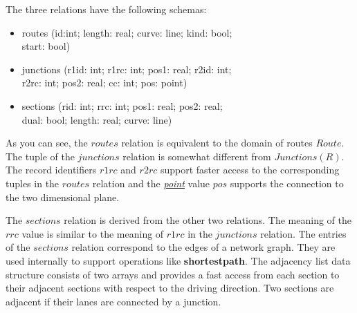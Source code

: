 \documentclass[a4paper]{article}
\newcommand{\op}[1]{\textbf{#1}}
\newcommand{\dt}[1]{\textsl{\underline{#1}}}
\begin{document}
The three relations have the following schemas:
\begin{ttfamily}
\begin{itemize}
  \item [] routes (id:int; length: real; curve: line; kind: bool;\\
 start: bool)
  \item [] junctions (r1id: int; r1rc: int; pos1: real; r2id: int;\\
r2rc: int; pos2: real; cc: int; pos: point)
  \item [] sections (rid: int; rrc: int; pos1: real; pos2: real;\\
dual: bool; length: real; curve: line)
\end{itemize}
\end{ttfamily}
As you can see, the $routes$ relation is equivalent to the domain of routes $Route$.
The tuple of the $junctions$ relation is somewhat different from $Junctions(R)$.
The record identifiers $r1rc$ and $r2rc$ support faster access to the corresponding
tuples in the $routes$ relation and the \dt{point} value $pos$ supports the
connection
to the two dimensional plane.

The $sections$ relation is derived from the other two relations. The meaning of
the $rrc$ value is similar to the meaning of $r1rc$ in the $junctions$ relation.
The entries of the $sections$ relation correspond to the edges of a network graph.
They are used internally to support operations like \op{shortestpath}. The adjacency
list data structure consists of two arrays and provides a fast
access from each section to their adjacent sections with respect to the driving
direction. Two sections are adjacent if their lanes are connected by a junction.
\end{document}

